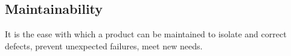\subsection{Maintainability}

It is the ease with which a product can be maintained to isolate and correct defects, prevent unexpected failures, meet new needs.